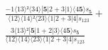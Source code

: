 \documentclass[varwidth, border=5pt]{standalone}
\begin{document}
\begin{my}
$\begin{gathered}
\scriptscriptstyle\frac{-1⟨13⟩²⟨34⟩[𝟓|2+3|1⟩⟨4𝟓⟩s_{𝟓}}{⟨12⟩⟨14⟩²⟨23⟩⟨1|2+3|4]s_{123}} +\\
\scriptscriptstyle\frac{3⟨13⟩²[𝟓|1+2|3⟩⟨4𝟓⟩s_{𝟓}}{⟨12⟩⟨14⟩⟨23⟩⟨1|2+3|4]s_{123}} \phantom{+}
\end{gathered}$
\end{my}
\end{document}
